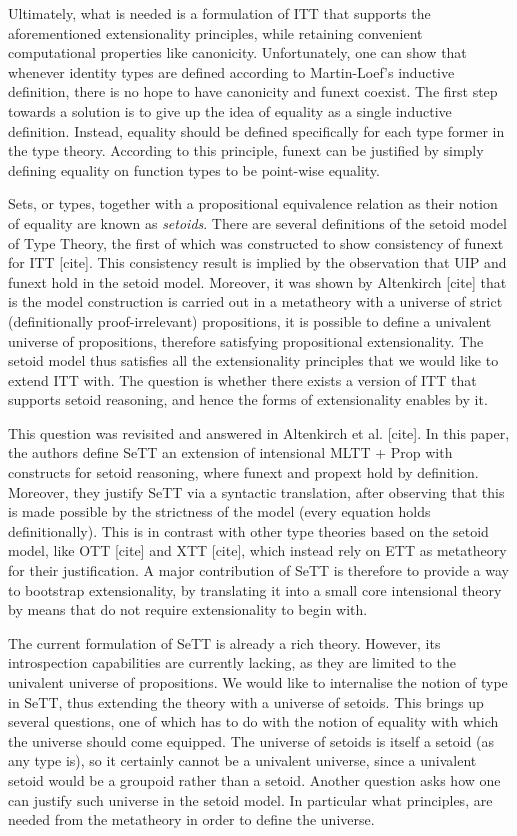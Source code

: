 \documentclass{easychair}
\begin{document}
Ultimately, what is needed is a formulation of ITT that supports the
aforementioned extensionality principles, while retaining convenient
computational properties like canonicity.
%
Unfortunately, one can show that whenever identity types are defined according
to Martin-Loef's inductive definition, there is no hope to have canonicity and
funext coexist.
%
The first step towards a solution is to give up the idea of equality as a single
inductive definition. Instead, equality should be defined specifically for each
type former in the type theory. According to this principle, funext can be
justified by simply defining equality on function types to be point-wise
equality.


Sets, or types, together with a propositional equivalence relation as their
notion of equality are known as \emph{setoids}. There are several definitions of
the setoid model of Type Theory, the first of which was constructed to show
consistency of funext for ITT [cite]. This consistency result is implied by the
observation that UIP and funext hold in the setoid model. Moreover, it was shown
by Altenkirch [cite] that is the model construction is carried out in a
metatheory with a universe of strict (definitionally proof-irrelevant)
propositions, it is possible to define a univalent universe of propositions,
therefore satisfying propositional extensionality. The setoid model thus
satisfies all the extensionality principles that we would like to extend ITT
with. The question is whether there exists a version of ITT that supports setoid
reasoning, and hence the forms of extensionality enables by it.

This question was revisited and answered in Altenkirch et al. [cite]. In this
paper, the authors define SeTT an extension of intensional MLTT + Prop with
constructs for setoid reasoning, where funext and propext hold by
definition. Moreover, they justify SeTT via a syntactic translation, after
observing that this is made possible by the strictness of the model (every
equation holds definitionally). This is in contrast with other type theories
based on the setoid model, like OTT [cite] and XTT [cite], which instead rely on
ETT as metatheory for their justification. A major contribution of SeTT is
therefore to provide a way to bootstrap extensionality, by translating it into a
small core intensional theory by means that do not require extensionality to
begin with.

The current formulation of SeTT is already a rich theory. However, its
introspection capabilities are currently lacking, as they are limited to the
univalent universe of propositions. We would like to internalise the notion of
type in SeTT, thus extending the theory with a universe of setoids.
%
This brings up several questions, one of which has to do with the notion of
equality with which the universe should come equipped. The universe of setoids
is itself a setoid (as any type is), so it certainly cannot be a univalent
universe, since a univalent setoid would be a groupoid rather than a setoid.
%
Another question asks how one can justify such universe in the setoid model. In
particular what principles, are needed from the metatheory in order to define
the universe.
\end{document}
